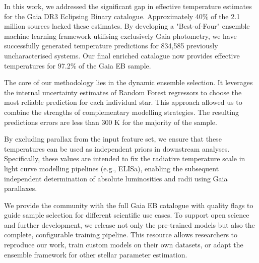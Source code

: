 \documentclass[preprint,12pt,authoryear]{elsarticle}
\begin{document}
In this work, we addressed the significant gap in effective temperature estimates for the Gaia DR3 Eclipsing Binary catalogue. 
Approximately 40\% of the 2.1 million sources lacked these estimates. 
By developing a "Best-of-Four" ensemble machine learning framework utilising exclusively Gaia photometry, we have successfully generated temperature predictions for 834,585 previously uncharacterised systems. 
Our final enriched catalogue now provides effective temperatures for 97.2\% of the Gaia EB sample.

The core of our methodology lies in the dynamic ensemble selection. 
It leverages the internal uncertainty estimates of Random Forest regressors to choose the most reliable prediction for each individual star. 
This approach allowed us to combine the strengths of complementary modelling strategies.
The resulting predictions errors are less than 300 K for the majority of the sample. 
 
By excluding parallax from the input feature set, we ensure that these temperatures can be used as independent priors in downstream analyses. 
Specifically, these values are intended to fix the radiative temperature scale in light curve modelling pipelines (e.g., ELISa), enabling the subsequent independent determination of absolute luminosities and radii using Gaia parallaxes.

We provide the community with the full Gaia EB catalogue with quality flags to guide sample selection for different scientific use cases. 
To support open science and further development, we release not only the pre-trained models but also the complete, configurable training pipeline. 
This resource allows researchers to reproduce our work, train custom models on their own datasets, or adapt the ensemble framework for other stellar parameter estimation.

 

\end{document}
